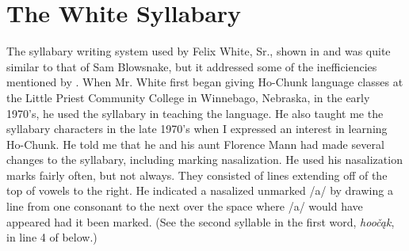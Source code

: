 \documentclass[output=paper]{LSP/langsci}
\begin{document}
\section{The White Syllabary}

The syllabary writing system used by Felix White, Sr., shown in  and  was quite similar to that of Sam Blowsnake, but it addressed some of the inefficiencies mentioned by \citeauthor{Susman1939}. When Mr. White first began giving Ho-Chunk language classes at the Little Priest Community College in Winnebago, Nebraska, in the early 1970's, he used the syllabary in teaching the language. He also taught me the syllabary characters in the late 1970's when I expressed an interest in learning Ho-Chunk. He told me that he and his aunt Florence Mann had made several changes to the syllabary, including marking nasalization. He used his nasalization marks fairly often, but not always. They consisted of lines extending off of the top of vowels to the right. He indicated a nasalized unmarked /a/ by drawing a line from one consonant to the next over the space where /a/ would have appeared had it been marked. (See the second syllable in the first word, \emph{hoo\v{c}\k{a}k}, in line 4 of  below.)
\end{document}
